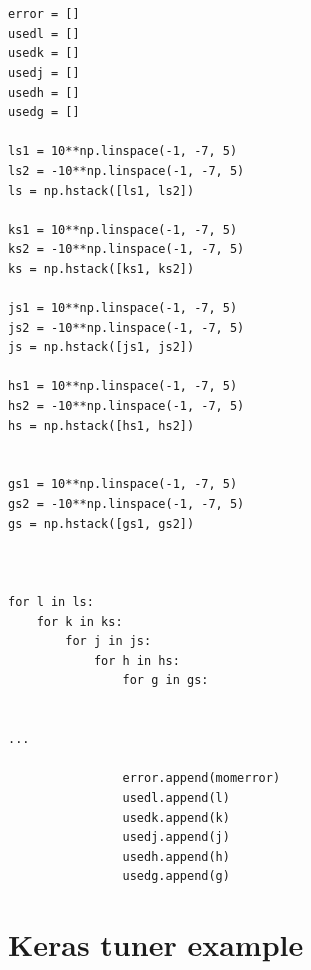 \documentclass[openany]{article}
\begin{document}
\begin{verbatim}


error = []
usedl = []
usedk = []
usedj = []
usedh = []
usedg = []

ls1 = 10**np.linspace(-1, -7, 5)
ls2 = -10**np.linspace(-1, -7, 5)
ls = np.hstack([ls1, ls2])

ks1 = 10**np.linspace(-1, -7, 5)
ks2 = -10**np.linspace(-1, -7, 5)
ks = np.hstack([ks1, ks2])

js1 = 10**np.linspace(-1, -7, 5)
js2 = -10**np.linspace(-1, -7, 5)
js = np.hstack([js1, js2])

hs1 = 10**np.linspace(-1, -7, 5)
hs2 = -10**np.linspace(-1, -7, 5)
hs = np.hstack([hs1, hs2])


gs1 = 10**np.linspace(-1, -7, 5)
gs2 = -10**np.linspace(-1, -7, 5)
gs = np.hstack([gs1, gs2])



for l in ls:
    for k in ks:
        for j in js:
            for h in hs:
                for g in gs:


...

                error.append(momerror)
                usedl.append(l)
                usedk.append(k)
                usedj.append(j)
                usedh.append(h)
                usedg.append(g)

\end{verbatim}

\newpage 

\section{Keras tuner example}
\end{document}
